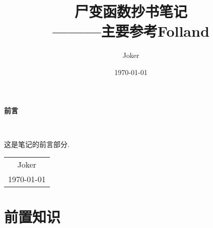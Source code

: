 \documentclass[12pt, a4paper, oneside]{ctexbook}
\title{{\Huge{\textbf{尸变函数抄书笔记}}}\\———主要参考Folland}
\author{Joker}
\date{\today}
\begin{document}
\maketitle

\setcounter{page}{1}

\begin{center}
    \Huge\textbf{前言}
\end{center}~\

这是笔记的前言部分. 
~\\
\begin{flushright}
    \begin{tabular}{c}
        Joker\\
        \today
    \end{tabular}
\end{flushright}

\newpage
{}
\setcounter{page}{1}
\tableofcontents
\newpage
\setcounter{page}{1}

\chapter{前置知识}
\end{document}
